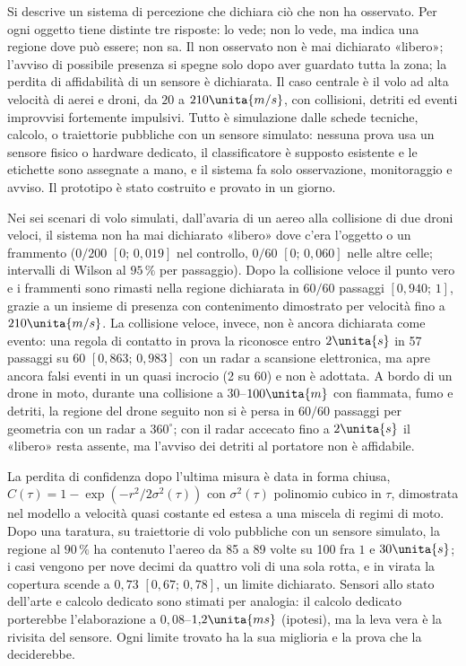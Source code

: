 Si descrive un sistema di percezione che dichiara ciò che non ha osservato. Per ogni oggetto tiene distinte tre risposte: lo vede; non lo vede, ma indica una regione dove può essere; non sa. Il non osservato non è mai dichiarato «libero»; l'avviso di possibile presenza si spegne solo dopo aver guardato tutta la zona; la perdita di affidabilità di un sensore è dichiarata. Il caso centrale è il volo ad alta velocità di aerei e droni, da $20$ a $210\unita{m/s}$, con collisioni, detriti ed eventi improvvisi fortemente impulsivi. Tutto è simulazione dalle schede tecniche, calcolo, o traiettorie pubbliche con un sensore simulato: nessuna prova usa un sensore fisico o hardware dedicato, il classificatore è supposto esistente e le etichette sono assegnate a mano, e il sistema fa solo osservazione, monitoraggio e avviso. Il prototipo è stato costruito e provato in un giorno.

Nei sei scenari di volo simulati, dall'avaria di un aereo alla collisione di due droni veloci, il sistema non ha mai dichiarato «libero» dove c'era l'oggetto o un frammento ($0/200$ $[0;\,0{,}019]$ nel controllo, $0/60$ $[0;\,0{,}060]$ nelle altre celle; intervalli di Wilson al $95\,\%$ per passaggio). Dopo la collisione veloce il punto vero e i frammenti sono rimasti nella regione dichiarata in $60/60$ passaggi $[0{,}940;\,1]$, grazie a un insieme di presenza con contenimento dimostrato per velocità fino a $210\unita{m/s}$. La collisione veloce, invece, non è ancora dichiarata come evento: una regola di contatto in prova la riconosce entro $2\unita{s}$ in 57 passaggi su 60 $[0{,}863;\,0{,}983]$ con un radar a scansione elettronica, ma apre ancora falsi eventi in un quasi incrocio (2 su 60) e non è adottata. A bordo di un drone in moto, durante una collisione a $30$--$100\unita{m}$ con fiammata, fumo e detriti, la regione del drone seguito non si è persa in $60/60$ passaggi per geometria con un radar a $360^\circ$; con il radar accecato fino a $2\unita{s}$ il «libero» resta assente, ma l'avviso dei detriti al portatore non è affidabile.

La perdita di confidenza dopo l'ultima misura è data in forma chiusa, $C(\tau)=1-\exp(-r^2/2\sigma^2(\tau))$ con $\sigma^2(\tau)$ polinomio cubico in $\tau$, dimostrata nel modello a velocità quasi costante ed estesa a una miscela di regimi di moto. Dopo una taratura, su traiettorie di volo pubbliche con un sensore simulato, la regione al $90\,\%$ ha contenuto l'aereo da 85 a 89 volte su 100 fra $1$ e $30\unita{s}$; i casi vengono per nove decimi da quattro voli di una sola rotta, e in virata la copertura scende a $0{,}73$ $[0{,}67;\,0{,}78]$, un limite dichiarato. Sensori allo stato dell'arte e calcolo dedicato sono stimati per analogia: il calcolo dedicato porterebbe l'elaborazione a $0{,}08$--$1{,}2\unita{ms}$ (ipotesi), ma la leva vera è la rivisita del sensore. Ogni limite trovato ha la sua miglioria e la prova che la deciderebbe.

